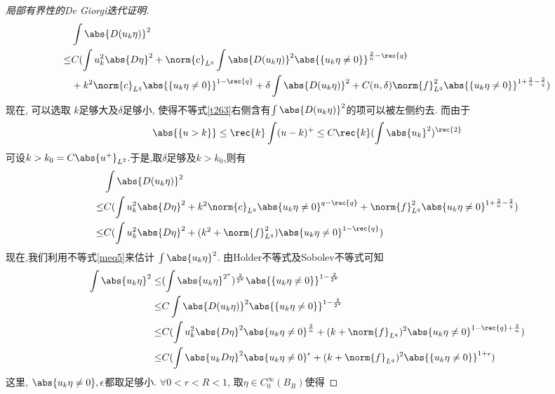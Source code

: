 \begin{proof}[局部有界性的De Giorgi迭代证明]
\begin{equation}
\begin{split}
            &\int \abs{D(u_k\eta)}^2  \\
            \le & C(\int u_k^2\abs{D\eta}^2 + \norm{c}_{L^q} \int \abs{D(u_k\eta)}^2 \abs{\{u_k\eta \ne 0\}}^{\frac{2 }{n}-\rec{q}} \\
            &+k^2\norm{c}_{L^q}\abs{\{u_k\eta\ne 0\}}^{1-\rec{q}} + \delta \int \abs{D(u_k\eta)}^2 + C(n,\delta)\norm{f}_{L^q}^2\abs{\{u_k\eta \ne 0\}}^{1+\frac{2 }{n}-\frac{2 }{q}})
        \end{split}
    \end{equation}
    现在, 可以选取 $k$足够大及$\delta$足够小, 使得不等式\eqref{t263}右侧含有$\int\abs{D(u_k\eta)}^2$的项可以被左侧约去.  而由于
    \begin{equation}
        \abs{\{u>k\}} \le \rec{k} \int (u-k)^+ \le C\rec{k}(\int \abs{u_k}^2)^\rec{2}
    \end{equation}
    可设$k>k_0=C\abs{u^+}_{L^2}$.于是,取$\delta$足够及$k>k_0$,则有
    \begin{equation} \label{meq5}
        \begin{split}
            &\int \abs{D(u_k\eta)}^2  \\
            \le &C(\int u_k^2 \abs{D\eta}^2+k^2\norm{c}_{L^q}\abs{u_k\eta\ne 0}^{q-\rec{q}}+\norm{f}^2_{L^q}\abs{u_k\eta\ne 0}^{1+\frac{2}{n}-\frac{2 }{q}}) \\
            \le & C(\int u_k^2\abs{D\eta}^2+(k^2+\norm{f}^2_{L^q})\abs{u_k\eta \ne 0}^{1-\rec{q}})
        \end{split}
    \end{equation}
    现在,我们利用不等式\eqref{meq5}来估计 $\int \abs{u_k \eta}^2$. 由Holder不等式及Sobolev不等式可知
    \begin{equation} \label{meq6}
        \begin{split}
            \int\abs{u_k \eta}^2 \le & (\int \abs{u_k\eta}^{2^*})^{\frac{2}{2^*}}\abs{\{u_k \eta \ne 0\}}^{1-\frac{2 }{2^*}} \\
            \le & C \int \abs{D(u_k\eta)}^2 \abs{\{u_k \eta \ne 0 \}}^{1-\frac{2 }{2^*}} \\
            \le & C(\int u_k^2 \abs{D\eta}^2 \abs{u_k\eta \ne 0}^\frac{2}{n} + (k+\norm{f}_{L^q})^2 \abs{u_k \eta \ne 0}^{1-\rec{q}+\frac{2 }{n}}) \\
            \le & C(\int \abs{u_k D\eta}^2\abs{u_k\eta\ne 0}^\epsilon + (k+\norm{f}_{L^q})^2\abs{\{u_k \eta \ne 0\}}^{1+\epsilon})
        \end{split}
    \end{equation} 
    这里, $ \abs{u_k\eta \ne 0}, \epsilon$都取足够小.  $\forall  0 < r < R < 1$, 取$ \eta \in C^\infty_0(B_R)$使得 

\end{proof}
